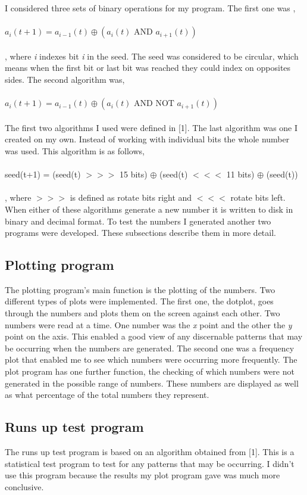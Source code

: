 \documentclass[a4paper,11pt,titlepage]{article}
\begin{document}
I considered three sets of binary operations for my program. The first one was ,
\\\\
$a_i(t+1)=a_{i-1}(t) \oplus (a_i(t) \textrm{ AND } a_{i+1}(t))$
\\\\
, where \emph{i} indexes bit \emph{i} in the seed. The seed was considered to be circular, which means when the first bit or last bit was reached they could index on opposites sides. The second algorithm was,
\\\\
$a_i(t+1)=a_{i-1}(t) \oplus (a_i(t) \textrm{ AND NOT } a_{i+1}(t))$
\\\\
The first two algorithms I used were defined in [1]. The last algorithm was one I created on my own. Instead of working with individual bits the whole number was used. This algorithm is as follows,
\\\\
seed(t+1) = (seed(t) $>>>$ 15 bits) $\oplus$ (seed(t) $<<<$  11 bits) $\oplus$ (seed(t))
\\\\
, where $>>>$ is defined as rotate bits right and $<<<$ rotate bits left.
When either of these algorithms generate a new number it is written to disk in binary and decimal format. To test the numbers I generated another two programs were developed. These subsections describe them in more detail.
\subsection{Plotting program}
The plotting program's main function is the plotting of the numbers. Two different types of plots were implemented. The first one, the dotplot, goes through the numbers and plots them on the screen against each other. Two numbers were read at a time. One number was the \emph{x} point and the other the \emph{y} point on the axis. This enabled a good view of any discernable patterns that may be occurring when the numbers are generated. The second one was a frequency plot that enabled me to see which numbers were occurring more frequently.
The plot program has one further function, the checking of which numbers were not generated in the possible range of numbers. These numbers are displayed as well as what percentage of the total numbers they represent.
\subsection{Runs up test program}
The runs up test program is based on an algorithm obtained from [1]. This is a statistical test program to test for any patterns that may be occurring. I didn't use this program because the results my plot program gave was much more conclusive.
\end{document}
